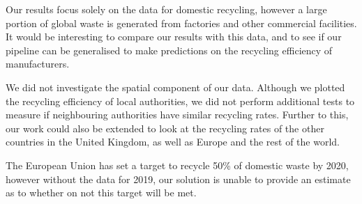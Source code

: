 \documentclass[11pt,conference]{IEEEtran}
\begin{document}
Our results focus solely on the data for domestic recycling, however a large portion of global waste is generated from factories and other commercial facilities. It would be interesting to compare our results with this data, and to see if our pipeline can be generalised to make predictions on the recycling efficiency of manufacturers.

We did not investigate the spatial component of our data. Although we plotted the recycling efficiency of local authorities, we did not perform additional tests to measure if neighbouring authorities have similar recycling rates. Further to this, our work could also be extended to look at the recycling rates of the other countries in the United Kingdom, as well as Europe and the rest of the world. 

The European Union has set a target to recycle 50\% of domestic waste by 2020, however without the data for 2019, our solution is unable to provide an estimate as to whether on not this target will be met. 



{}

\end{document}

